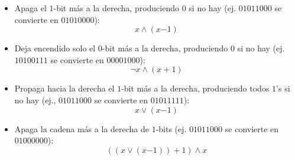 \begin{itemize}
    \item{
		Apaga el $1$-bit m\'as a la derecha, produciendo $0$ 
		si no hay (ej. $01011000$ se convierte en $01010000$): 
		$$ x \wedge (x{-1}) $$
    }
    \item{
		Deja encendido solo el $0$-bit m\'as a la derecha, produciendo $0$ si no hay 
		(ej. $10100111$ se convierte en $00001000$):
		$$ \neg x \wedge ( x+1 ) $$
	}
	\item{
		Propaga hacia la derecha el $1$-bit m\'as a la derecha, produciendo todos $1$'s si no hay (ej.,
		$01011000$ se convierte en $01011111$):
	    $$ x \vee (x{-1}) $$
	}
	\item{
		Apaga la cadena m\'as a la derecha de $1$-bits (ej. $01011000$ se convierte en $01000000$):
		$$ ( (x \vee (x{-1})) + 1) \wedge x $$
	}
\end{itemize}

